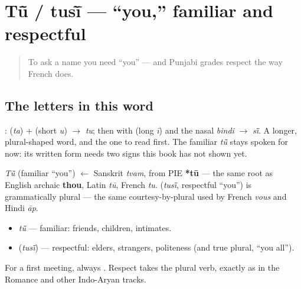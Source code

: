 \section[\texorpdfstring{\pa{ਤੂੰ} / \pa{ਤੁਸੀਂ} (tū̃ / tusī̃)}{ਤੂੰ / ਤੁਸੀਂ (tū̃ / tusī̃)}]{Tū̃ / tusī̃ — \textquotedblleft{}you,\textquotedblright{} familiar and respectful}

\label{lesson:PA-C02-tu-tusi}



\begin{quote}
To ask a name you need \textquotedblleft{}you\textquotedblright{} — and Punjabi grades respect the way French does.
\end{quote}

\subsection*{The letters in this word}
\textbf{}: \textbf{} (\emph{ta}) + \textbf{} (short \emph{u}) $\to$ \emph{tu}; then \textbf{} with \textbf{} (long \emph{ī}) and the nasal \emph{bindi} \textbf{} $\to$ \emph{sī̃}. A longer, plural-shaped word, and the one to read first. The familiar \emph{tū̃} stays spoken for now: its written form needs two signs this book has not shown yet.

\begin{cousinweb}
\emph{Tū̃} (familiar \textquotedblleft{}you\textquotedblright{}) $\leftarrow$ Sanskrit \emph{tvam}, from PIE \textbf{*tū} — the same root as English archaic \textbf{thou}, Latin \emph{tū}, French \emph{tu}. \textbf{} (\emph{tusī̃}, respectful \textquotedblleft{}you\textquotedblright{}) is grammatically plural — the same courtesy-by-plural used by French \emph{vous} and Hindi \emph{āp}.
\end{cousinweb}

\begin{grammarlens}[title={Grammar Lens: two levels of \textquotedblleft{}you\textquotedblright{}}]
\begin{itemize}
\raggedright
  \item \emph{tū̃} — familiar: friends, children, intimates.
  \item \textbf{} (\emph{tusī̃}) — respectful: elders, strangers, politeness (and true plural, \textquotedblleft{}you all\textquotedblright{}).
\end{itemize}

For a first meeting, always \textbf{}. Respect takes the plural verb, exactly as in the Romance and other Indo-Aryan tracks.
\end{grammarlens}

